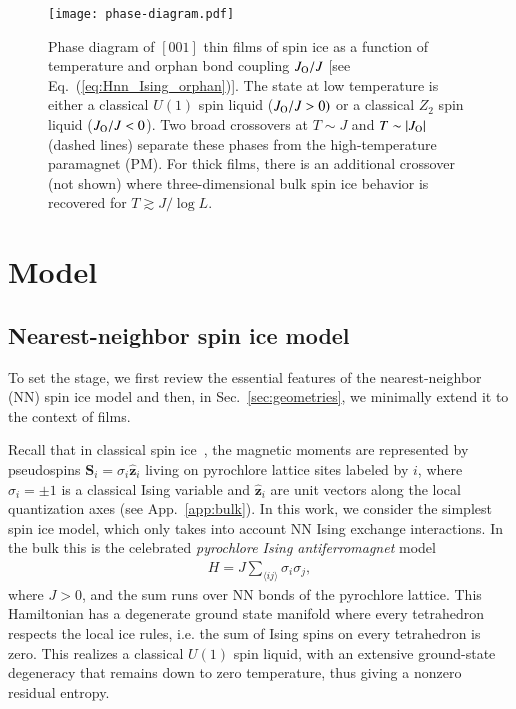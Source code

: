 \documentclass[aps,prx,reprint,runinaddress,superscriptaddress,amsmath,amssymb,floatfix,longbibliography]{revtex4-1}
\renewcommand{\vec}[1]{\boldsymbol{#1}}
\newcommand{\Jo}{J_{\rm O}}
\begin{document}
\begin{figure}[t]
  \centering
  \texttt{[image: phase-diagram.pdf]}
  \caption{Phase diagram of $[001]$ thin films of spin ice as a function of temperature and orphan bond coupling $\Jo/J$ [see Eq.~(\ref{eq:Hnn_Ising_orphan})]. The state at low temperature is either a classical $U(1)$ spin liquid ($\Jo/J>0)$ or a classical $Z_2$ spin liquid ($\Jo/J<0$). Two broad crossovers at $T \sim J$ and $T \sim |\Jo|$ (dashed lines) separate these phases from the high-temperature paramagnet (PM). For thick films, there is an additional crossover (not shown) where three-dimensional bulk spin ice behavior is recovered for $T \gtrsim J/\log L$.
    \label{fig:phase-diagram}
	}
\end{figure}

\section{Model}
\label{sec:model}
\subsection{Nearest-neighbor spin ice model}
\label{sec:model_A}

To set the stage, we first review the essential features of the nearest-neighbor (\ac{NN}) spin ice model and then, in Sec.~\ref{sec:geometries}, we minimally extend it to the context of films.

Recall that in classical spin ice~\cite{RauPRB2015}, the magnetic moments are represented by pseudospins $ \vec{S}_i= \sigma_i \vec{\hat{z}}_i $ living on pyrochlore lattice sites labeled by $i$, where $\sigma_i = \pm 1$ is a classical Ising variable and $\hat{\vec{z}}_i$ are unit vectors along the local quantization axes (see App.~\ref{app:bulk}).
In this work, we consider the simplest spin ice model, which only takes into account \ac{NN} Ising exchange interactions. In the bulk this is the celebrated \emph{pyrochlore Ising antiferromagnet} model~\cite{Anderson1956}
\begin{align}
	H = J \sum_{\langle ij\rangle} \sigma_i \sigma_j ,
	\label{eq:Hnn_Ising}
\end{align}
where $J>0$, and the sum runs over \ac{NN} bonds of the pyrochlore lattice. This Hamiltonian has a degenerate ground state manifold where every tetrahedron respects the local ice rules, i.e. the sum of Ising spins on every tetrahedron is zero. This realizes a classical $U(1)$ spin liquid, with an extensive ground-state degeneracy that remains down to zero temperature, thus giving a nonzero residual entropy. 
\end{document}
